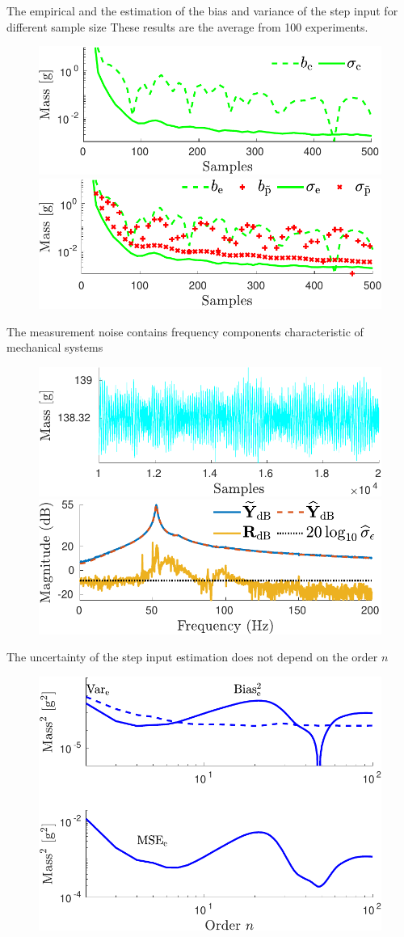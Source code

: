 \documentclass[presentation]{beamer}
\begin{document}
\begin{frame}[label={slide:experimental-validation5}]{The empirical and the estimation of the bias and variance of the step input for different sample size}
These results are the average from 100 experiments. 
\begin{figure}[htb!]
\centering
\includegraphics[width=0.55\columnwidth]{./fig/Exp_Fig_8.pdf} 
\includegraphics[width=0.55\columnwidth]{./fig/Exp_Fig_11.pdf} 
\end{figure}
\end{frame}

\begin{frame}[label={slide:experimental-validation6}]{The measurement noise contains frequency components characteristic of mechanical systems}
\begin{figure}[htb!]
\centering
\includegraphics[width=0.55\columnwidth]{./fig/Exp_Fig_7.pdf} 
\includegraphics[width=0.55\columnwidth]{./fig/Exp_Fig_9.pdf} 
\end{figure}
\end{frame}

\begin{frame}[label={slide:experimental-validation7}]{The uncertainty of the step input estimation does not depend on the order $n$}
\begin{figure}[htb!]
\centering
\includegraphics[width=0.55\columnwidth]{./fig/Exp_Fig_12.pdf} 
\end{figure}
\end{frame}
\end{document}
